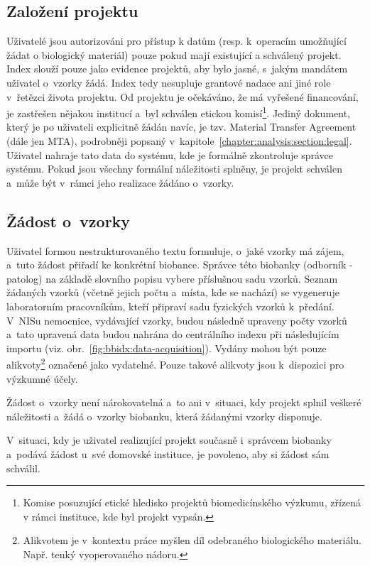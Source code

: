\documentclass[11pt,draft,oneside]{fithesis2}
\begin{document}
\subsection{Založení projektu}
Uživatelé jsou autorizováni pro přístup k datům (resp. k~operacím umožňující žádat o biologický materiál) pouze pokud mají existující a schválený projekt. Index slouží pouze jako evidence projektů, aby bylo jasné, s~jakým mandátem uživatel o~vzorky žádá. Index tedy nesupluje grantové nadace ani jiné role v~řetězci života projektu. Od projektu je očekáváno, že má vyřešené financování, je zastřešen nějakou institucí a~byl schválen etickou komisí\footnote{Komise posuzující etické hledisko projektů biomedicínského výzkumu, zřízená v rámci instituce, kde byl projekt vypsán.}. Jediný dokument, který je po uživateli explicitně žádán navíc, je tzv. Material Transfer Agreement (dále jen MTA), podrobněji popsaný v~kapitole~\ref{chapter:analysis:section:legal}. Uživatel nahraje tato data do systému, kde je formálně zkontroluje správce systému. Pokud jsou všechny formální náležitosti splněny, je projekt schválen a~může být v~rámci jeho realizace žádáno o~vzorky.

\subsection{Žádost o~vzorky}
Uživatel formou nestrukturovaného textu formuluje, o~jaké vzorky má zájem, a~tuto žádost přiřadí ke konkrétní biobance. Správce této biobanky (odborník - patolog) na základě slovního popisu vybere příslušnou sadu vzorků. Seznam žádaných vzorků (včetně jejich počtu a~místa, kde se nachází) se vygeneruje laboratorním pracovníkům, kteří připraví sadu fyzických vzorků k~předání. V~NISu nemocnice, vydávající vzorky, budou následně upraveny počty vzorků a~tato upravená data budou nahrána do centrálního indexu při následujícím importu (viz. obr.~\ref{fig:bbidx:data-acquisition}). Vydány mohou být pouze alikvoty\footnote{Alikvotem je v~kontextu práce myšlen díl odebraného biologického materiálu. Např. tenký  vyoperovaného nádoru.} označené jako vydatelné. Pouze takové alikvoty jsou k~dispozici pro výzkumné účely.

Žádost o~vzorky není nárokovatelná a~to ani v~situaci, kdy projekt splnil veškeré náležitosti a~žádá o~vzorky biobanku, která žádanými vzorky disponuje.

V~situaci, kdy je uživatel realizující projekt současně i~správcem biobanky a~podává žádost u~své domovské instituce, je povoleno, aby si žádost sám schválil.
\end{document}
